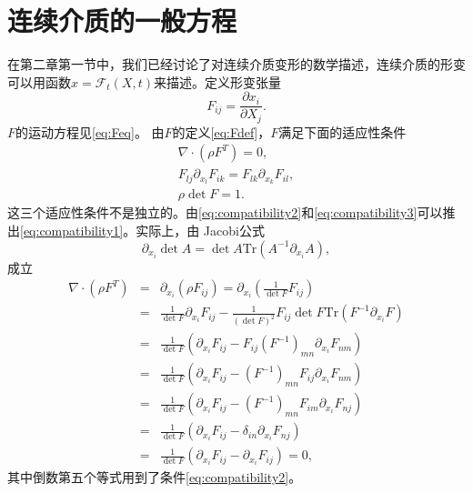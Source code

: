 \section{连续介质的一般方程}
在第二章第一节中，我们已经讨论了对连续介质变形的数学描述，连续介质的形变可以用函数$x=\mathcal{F}_t (X,t)$来描述。定义形变张量
\begin{equation}\label{eq:Fdef}
	F_{ij} = \frac{\partial x_i}{\partial X_j}.
\end{equation}
$F$的运动方程见\eqref{eq:Feq}。
由$F$的定义\eqref{eq:Fdef}，$F$满足下面的适应性条件
\begin{subequations}
\begin{align}
\nabla \cdot (\rho F^T) = 0,\label{eq:compatibility1} \\
 F_{lj} \partial_{x_l} F_{ik} = F_{lk} \partial_{x_k} F_{il} , \label{eq:compatibility2} \\
 \rho \det F = 1. \label{eq:compatibility3} 
\end{align}
\end{subequations}
这三个适应性条件不是独立的。由\eqref{eq:compatibility2}和\eqref{eq:compatibility3}可以推出\eqref{eq:compatibility1}。实际上，由
Jacobi公式
$$
\partial_{x_i}\det A = \det A \mbox{Tr}(A^{-1} \partial_{x_i} A),
$$
成立
\begin{eqnarray*}
\nabla \cdot (\rho F^T)  & = &\partial_{x_i} ( \rho F_{ij}) = \partial_{x_i} ( \frac{1}{\det F} F_{ij})  \\
&=& \frac{1}{\det F} \partial_{x_i} F_{ij}  - \frac{1}{(\det F)^2} F_{ij} \det F \mbox{Tr}(F^{-1} \partial_{x_i} F) \\
&=&\frac{1}{\det F} (\partial_{x_i} F_{ij} - F_{ij} (F^{-1})_{mn} \partial_{x_i} F_{nm}) \\
&=& \frac{1}{\det F} (\partial_{x_i} F_{ij} - (F^{-1})_{mn} F_{ij} \partial_{x_i} F_{nm}) \\
&=&  \frac{1}{\det F} (\partial_{x_i} F_{ij} - (F^{-1})_{mn} F_{im} \partial_{x_i} F_{nj}) \\
&=&  \frac{1}{\det F} (\partial_{x_i} F_{ij} - \delta_{in} \partial_{x_i} F_{nj}) \\
&=&  \frac{1}{\det F} (\partial_{x_i} F_{ij} - \partial_{x_i} F_{ij}) =0 ,
\end{eqnarray*}
其中倒数第五个等式用到了条件\eqref{eq:compatibility2}。

